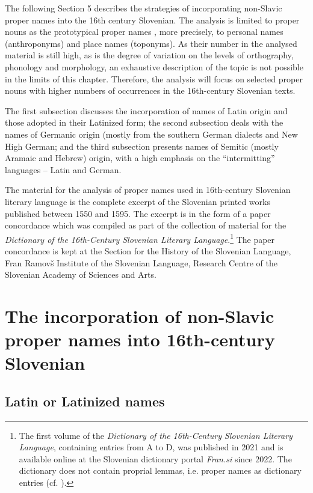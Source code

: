 \documentclass[output=paper,colorlinks,citecolor=brown,arabicfont,chinesefont]{langscibook}
\begin{document}
The following Section 5 describes the strategies of incorporating non-Slavic proper names into the 16th century Slovenian. The analysis is limited to proper nouns as the prototypical proper names \citep[92--93]{Vermes2003}, more precisely, to personal names (anthroponyms) and place names (toponyms).  As their number in the analysed material is still high, as is the degree of variation on the levels of orthography, phonology and morphology, an exhaustive description of the topic is not possible in the limits of this chapter. Therefore, the analysis will focus on selected proper nouns with higher numbers of occurrences in the 16th-century Slovenian texts.

The first subsection discusses the incorporation of names of Latin origin and those adopted in their Latinized form; the second subsection deals with the names of Germanic origin (mostly from the southern German dialects and New High German; and the third subsection presents names of Semitic (mostly Aramaic and Hebrew) origin, with a high emphasis on the “intermitting” languages – Latin and German. 

The material for the analysis of proper names used in 16th-century Slovenian literary language is the complete excerpt of the Slovenian printed works published between 1550 and 1595. The excerpt is in the form of a paper concordance which was compiled as part of the collection of material for the \emph{Dictionary of the 16th-Century Slovenian Literary Language}.\footnote{The first volume of the \emph{Dictionary of the 16th-Century Slovenian Literary Language}, containing entries from A to D, was published in 2021 and is available online at the Slovenian dictionary portal \emph{Fran.si} since 2022. The dictionary does not contain proprial lemmas, i.e. proper names as dictionary entries (cf. \citealt{Langendonck2007}). } The paper concordance is kept at the Section for the History of the Slovenian Language, Fran Ramovš Institute of the Slovenian Language, Research Centre of the Slovenian Academy of Sciences and Arts.

\section{The incorporation of non-Slavic proper names into 16th-century Slovenian}

\subsection{Latin or Latinized names}
\end{document}
